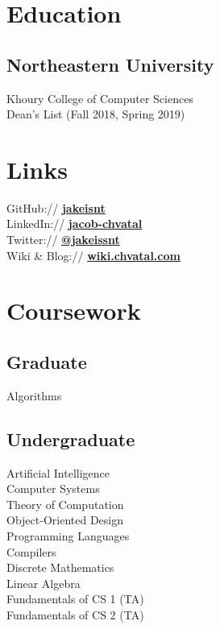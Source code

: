 \documentclass[letterpaper]{cv} %
\begin{document}
\begin{minipage}[t]{0.33\textwidth} %

\section{Education}
\subsection{Northeastern University}
Khoury College of Computer Sciences \\
Dean's List (Fall 2018, Spring 2019) \\
 \sectionspace %

\section{Links}
GitHub:// \href{https://github.com/jakeisnt}{\bf jakeisnt} \\
LinkedIn:// \href{https://www.linkedin.com/in/jacob-chvatal}{\bf jacob-chvatal} \\
Twitter:// \href{https://twitter.com/jakeissnt}{\bf @jakeissnt} \\
Wiki \& Blog:// \href{https://wiki.chvatal.com}{\bf wiki.chvatal.com} \\
\sectionspace

\section{Coursework}
\subsection{Graduate}
Algorithms
\sectionspace

\subsection{Undergraduate}
Artificial Intelligence \\
Computer Systems \\
Theory of Computation \\
Object-Oriented Design \\
Programming Languages \\
Compilers \\
Discrete Mathematics \\
Linear Algebra \\
Fundamentals of CS 1 (TA) \\
Fundamentals of CS 2 (TA) \\


\end{minipage}
\end{document}
